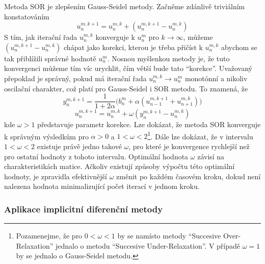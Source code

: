 \documentclass[a4paper]{book}
\begin{document}
Metoda SOR je zlepšením Gauss-Seidel metody. Začněme zdánlivě triviálním konstatováním
\begin{equation*}
u_n^{m,k+1} = u_n^{m,k} + (u_n^{m,k+1} - u_n^{m,k})
\end{equation*}
S tím, jak iterační řada $u_n^{m,k}$ konverguje k $u_n^m$ pro $k \rightarrow \infty$, můžeme $(u_n^{m,k+1} - u_n^{m,k})$ chápat jako korekci, kterou je třeba přičíst k $u_n^{m,k}$ abychom se tak přiblížili správné hodnotě $u_n^m$. Nosnou myšlenkou metody je, že tuto konvergenci můžeme tím víc urychlit, čím větší bude tato ``korekce''. Uvažovaný přepoklad je správný, pokud má iterační řada $u_n^{m,k} \rightarrow u_n^m$ monotónní a nikoliv oscilační charakter, což platí pro Gauss-Seidel i SOR metodu. To znamená, že
\begin{equation*}
y_n^{m,k+1} = \frac{1}{1 + 2 \alpha} \Big( b_n^m + \alpha(u_{n-1}^{m,k+1} + u_{n+1}^{m,k}) \Big)
\end{equation*}
\begin{equation*}
u_n^{m, k+1} = u_n^{m,k} + \omega(y_n^{m,k+1}-u_n^{m,k})
\end{equation*}
kde $\omega > 1$ představuje parametr korekce. Lze dokázat, že metoda SOR konverguje k správným výsledkům pro $\alpha > 0$ a $1 < \omega < 2$\footnote{Pozamenejme, že pro $0 < \omega < 1$ by se namísto metody ``Succesive Over-Relaxation'' jednalo o metodu ``Succesive Under-Relaxation''. V případě $\omega = 1$ by se jednalo o Gauss-Seidel metodu.}. Dále lze dokázat, že v intervalu $1 < \omega < 2$ existuje právě jedno takové $\omega$, pro které je konvergence rychlejší než pro ostatní hodnoty z tohoto intervalu. Optimální hodnota $\omega$ závisí na charakteristikách matice. Ačkoliv existují způsoby výpočtu této optimální hodnoty, je zpravidla efektivnější $\omega$ změnit po každém časovém kroku, dokud není nalezena hodnota minimalizující počet iterací v jednom kroku.

\subsubsection{Aplikace implicitní diferenční metody}
\end{document}
